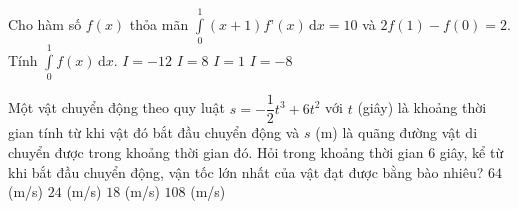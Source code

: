 \begin{ex}%
	Cho hàm số $f(x)$ thỏa mãn $\displaystyle\int\limits_0^1(x+1)f’(x)\mathrm{\,d}x=10$ và $2f(1)-f(0)=2$. Tính $\displaystyle\int\limits_0^1 f(x)\mathrm{\,d}x$. 
	\choice
	{$I=-12$}
	{$I=8$}
	{$I=1$}
	{\True $I=-8$}
\end{ex}
\begin{ex}%
	Một vật chuyển động theo quy luật $s=-\dfrac{1}{2}t^3+6t^2$ với $t$ (giây) là khoảng thời gian tính từ khi vật đó bắt đầu chuyển động và $s$ (m) là quãng đường vật di chuyển được trong khoảng thời gian đó. Hỏi trong khoảng thời gian $6$ giây, kể từ khi bắt đầu chuyển động, vận tốc lớn nhất của vật đạt được bằng bào nhiêu?
	\choice
	{$64$ (m/s)}
	{\True $24$ (m/s)}
	{$18$ (m/s)}
	{$108$ (m/s)}
\end{ex}

